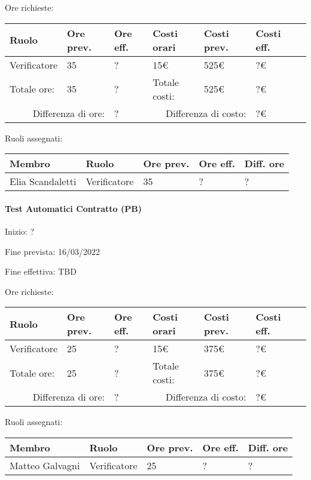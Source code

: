 \documentclass[a4paper, 12pt]{article}
\begin{document}
Ore richieste:\\[0.5em]
\begin{tabular}{|l|l|l||l|l|l|l|}\hline
Ruolo & Ore prev. & Ore eff. & Costi orari & Costi prev. & Costi eff.\\\hline
Verificatore & 35 & ? & 15\euro & 525\euro & ?\euro \\\hline
Totale ore: & 35 & ? & Totale costi: & 525\euro & ?\euro \\\hline
\multicolumn{2}{|r|}{Differenza di ore:} & ? & \multicolumn{2}{r|}{Differenza di costo:} & ?\euro \\\hline
\end{tabular}

Ruoli assegnati:\\[0.5em]
\begin{tabular}{|l|l|l|l|l|}\hline
Membro & Ruolo & Ore prev. & Ore eff. & Diff. ore \\\hline
Elia Scandaletti & Verificatore & 35 & ? & ? \\\hline
\end{tabular}

\paragraph{Test Automatici Contratto (PB)}
Inizio: ?\par
Fine prevista: 16/03/2022\par
Fine effettiva: TBD

Ore richieste:\\[0.5em]
\begin{tabular}{|l|l|l||l|l|l|l|}\hline
Ruolo & Ore prev. & Ore eff. & Costi orari & Costi prev. & Costi eff.\\\hline
Verificatore & 25 & ? & 15\euro & 375\euro & ?\euro \\\hline
Totale ore: & 25 & ? & Totale costi: & 375\euro & ?\euro \\\hline
\multicolumn{2}{|r|}{Differenza di ore:} & ? & \multicolumn{2}{r|}{Differenza di costo:} & ?\euro \\\hline
\end{tabular}

Ruoli assegnati:\\[0.5em]
\begin{tabular}{|l|l|l|l|l|}\hline
Membro & Ruolo & Ore prev. & Ore eff. & Diff. ore \\\hline
Matteo Galvagni & Verificatore & 25 & ? & ? \\\hline
\end{tabular}
\end{document}
